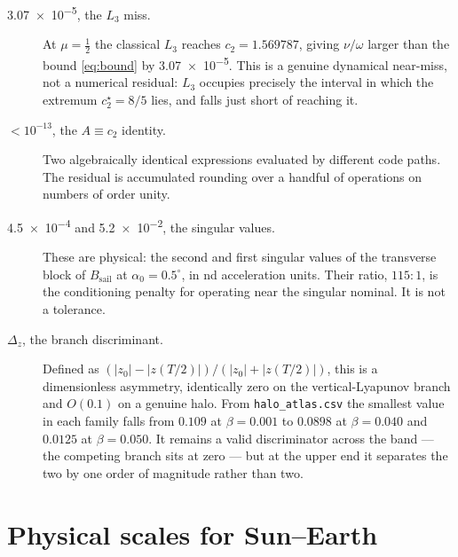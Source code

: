 \documentclass[11pt,a4paper]{article}
\begin{document}
\begin{description}
\item[\num{3.07e-5}, the $L_3$ miss.] At $\mu=\tfrac12$ the classical $L_3$
reaches $c_2=1.569787$, giving $\nu/\omega$ larger than the bound
\eqref{eq:bound} by \num{3.07e-5}. This is a genuine dynamical near-miss, not a
numerical residual: $L_3$ occupies precisely the interval in which the extremum
$c_2^\star=8/5$ lies, and falls just short of reaching it.

\item[$<10^{-13}$, the $A\equiv c_2$ identity.] Two algebraically identical
expressions evaluated by different code paths. The residual is accumulated
rounding over a handful of operations on numbers of order unity.

\item[\num{4.5e-4} and \num{5.2e-2}, the singular values.] These are physical:
the second and first singular values of the transverse block of
$B_{\mathrm{sail}}$ at $\alpha_0=0.5^\circ$, in nd acceleration units. Their
ratio, $115{:}1$, is the conditioning penalty for operating near the singular
nominal. It is not a tolerance.

\item[$\Delta_z$, the branch discriminant.]\label{sec:deltaz} Defined as
$(\lvert z_0\rvert-\lvert z(T/2)\rvert)/(\lvert z_0\rvert+\lvert z(T/2)\rvert)$,
this is a dimensionless asymmetry, identically zero on the vertical-Lyapunov
branch and $O(0.1)$ on a genuine halo. From \texttt{halo\_atlas.csv} the
smallest value in each family falls from $0.109$ at $\beta=0.001$ to $0.0898$
at $\beta=0.040$ and $0.0125$ at $\beta=0.050$. It remains a valid
discriminator across the band --- the competing branch sits at zero --- but at
the upper end it separates the two by one order of magnitude rather than two.
\end{description}

\section{Physical scales for Sun--Earth}\label{sec:scales}
\end{document}
